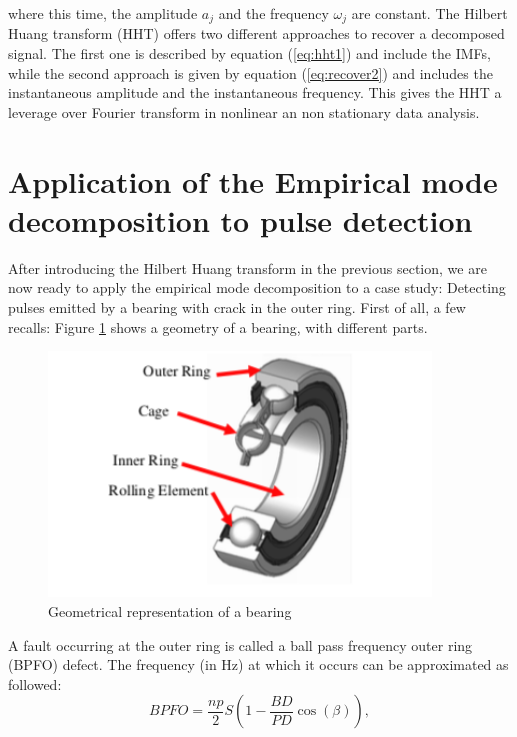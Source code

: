 \documentclass[../Main/thesis.tex]{subfiles}
\begin{document}
where this time, the amplitude $a_{j}$ and the frequency $\omega_{j}$ are constant. The Hilbert Huang transform (HHT) offers two different approaches to recover a decomposed signal. The first one is described by equation (\ref{eq:hht1}) and include the IMFs, while the second approach is given by equation (\ref{eq:recover2}) and includes the instantaneous amplitude and the instantaneous frequency. This gives the HHT a leverage over Fourier transform in nonlinear an non stationary data analysis.

\section{Application of the Empirical mode decomposition to pulse detection}
\label{sec:pulse}
After introducing the Hilbert Huang transform in the previous section, we are now ready to apply the empirical mode decomposition to a case study: Detecting pulses emitted by a bearing with crack in the outer ring. First of all, a few recalls: Figure \ref{fig:bearing-architecture} shows a geometry of a bearing, with different parts.
\begin{figure}[H] %
   \centering
   \includegraphics[width=4in]{../fig/bearing.png} 
   \caption{Geometrical representation of a bearing}
   \label{fig:bearing-architecture}
\end{figure}
\justify
A fault occurring at the outer ring is called a ball pass frequency outer ring (BPFO) defect. The frequency (in Hz) at which it occurs can be approximated as followed:
\begin{equation}
BPFO = \frac{np}{2}S\left(1-\frac{BD}{PD}\cos\left(\beta\right)  \right) \nonumber,
\end{equation}
\end{document}
